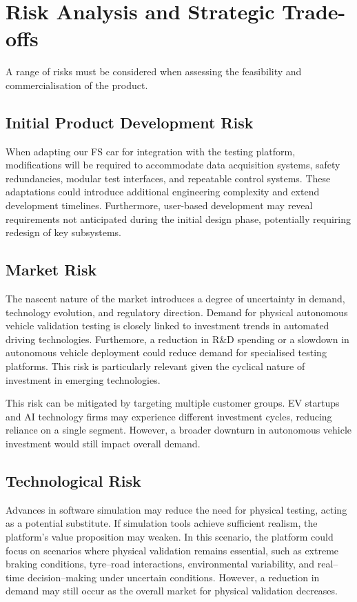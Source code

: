 \section{Risk Analysis and Strategic Trade-offs}
\label{sec:risk_analysis_strategic_tradeoffs}

A range of risks must be considered when assessing the feasibility and commercialisation of the product.

\subsection{Initial Product Development Risk}

When adapting our FS car for integration with the testing platform, modifications will be required to accommodate data acquisition systems, safety redundancies, modular test interfaces, and repeatable control systems. These adaptations could introduce additional engineering complexity and extend development timelines. Furthermore, user-based development may reveal requirements not anticipated during the initial design phase, potentially requiring redesign of key subsystems.

\subsection{Market Risk}

The nascent nature of the market introduces a degree of uncertainty in demand, technology evolution, and regulatory direction. Demand for physical autonomous vehicle validation testing is closely linked to investment trends in automated driving technologies. Furthemore, a reduction in R\&D spending or a slowdown in autonomous vehicle deployment could reduce demand for specialised testing platforms. This risk is particularly relevant given the cyclical nature of investment in emerging technologies.

This risk can be mitigated by targeting multiple customer groups. EV startups and AI technology firms may experience different investment cycles, reducing reliance on a single segment. However, a broader downturn in autonomous vehicle investment would still impact overall demand.

\subsection{Technological Risk}

Advances in software simulation may reduce the need for physical testing, acting as a potential substitute. If simulation tools achieve sufficient realism, the platform’s value proposition may weaken. In this scenario, the platform could focus on scenarios where physical validation remains essential, such as extreme braking conditions, tyre–road interactions, environmental variability, and real--time decision--making under uncertain conditions. However, a reduction in demand may still occur as the overall market for physical validation decreases.

